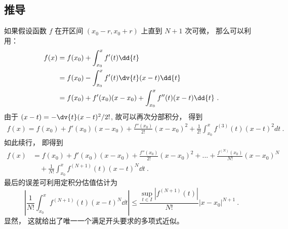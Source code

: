 \subsection{推导}
如果假设函数 $f$ 在开区间 $(x_0-r,x_0+r)$ 上直到 $N+1$ 次可微， 那么可以利用：
\begin{equation}
\begin{aligned}
f(x)
&=f(x_0)+\int_{x_0}^{x}f'(t)\dd{t}\\
&=f(x_0)-\int_{x_0}^{x}f'(t)\dv{t}(x-t) \dd{t}\\
&=f(x_0)+f'(x_0)(x-x_0)+\int_{x_0}^{x}f''(t)(x-t) \dd{t}~.
\end{aligned}
\end{equation}
由于 $(x-t)=-\dv{t} (x-t)^2/2!$, 故可以再次分部积分， 得到
\begin{equation}
\begin{aligned}
f(x)
=f(x_0)+f'(x_0)(x-x_0)+\frac{f''(x_0)}{2!}(x-x_0)^2
+\frac{1}{2!}\int_{x_0}^{x}f^{(3)}(t)(x-t)^2dt~.
\end{aligned}
\end{equation}
如此续行， 即得到
\begin{equation}\label{eq_Tayl_4}
\begin{aligned}
f(x)
&=f(x_0)+f'(x_0)(x-x_0)+\frac{f''(x_0)}{2!}(x-x_0)^2+...+\frac{f^{(N)}(x_0)}{N!}(x-x_0)^N\\
&\quad+\frac{1}{N!}\int_{x_0}^{x}f^{(N+1)}(t)(x-t)^{N} \dd{t}~.
\end{aligned}
\end{equation}
最后的误差可利用定积分估值估计为
\begin{equation}
\left|\frac{1}{N!}\int_{x_0}^{x}f^{(N+1)}(t)(x-t)^{N} \dd{t} \right|
\leq\frac{\sup_{t\in I}|f^{(N+1)}(t)|}{N!}|x-x_0|^{N+1}~.
\end{equation}
显然， 这就给出了唯一一个满足开头要求的多项式近似。
